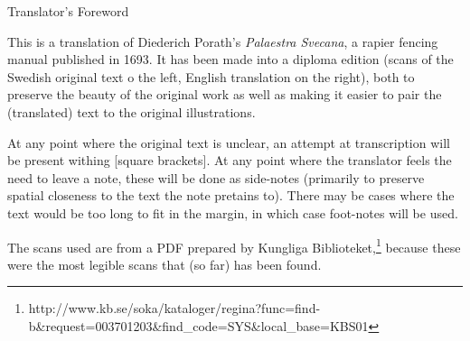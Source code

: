 {\large Translator's Foreword}

This is a translation of Diederich Porath's {\it Palaestra Svecana}, a rapier fencing manual published in 1693. It has been made into a diploma edition (scans of the Swedish original text o the left, English translation on the right), both to preserve the beauty of the original work as well as making it easier to pair the (translated) text to the original illustrations.

At any point where the original text is unclear, an attempt at transcription will be present withing [square brackets]. At any point where the translator feels the need to leave a note, these will be done as side-notes (primarily to preserve spatial closeness to the text the note pretains to).  There may be cases where the text would be too long to fit in the margin, in which case foot-notes will be used.

The scans used are from a PDF prepared by Kungliga Biblioteket,\footnote{ http://www.kb.se/soka/kataloger/regina?func=find-b\&request=003701203\&find\_code=SYS\&local\_base=KBS01} because these were the most legible scans that (so far) has been found.
